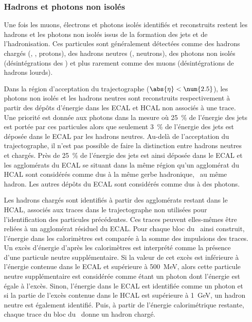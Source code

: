 \subsubsection{Hadrons et photons non isolés}
Une fois les muons, électrons et photons isolés identifiés et reconstruits restent les hadrons et les photons non isolés issus de la formation des jets et de l'hadronisation.
Ces particules sont généralement détectées comme des hadrons chargés (\pionpm, \Kaonpm, protons), des hadrons neutres (\Kaonlong, neutrons), des photons non isolés (désintégrations des \pionnull) et plus rarement comme des muons (désintégrations de hadrons lourds).
\par Dans la région d'acceptation du trajectographe ($\abs{\eta}<\num{2.5}$), les photons non isolés et les hadrons neutres sont reconstruits respectivement à partir des dépôts d'énergie dans les ECAL et HCAL non associés à une trace.
Une priorité est donnée aux photons dans la mesure où \SI{25}{\%} de l'énergie des jets est portée par ces particules alors que seulement \SI{3}{\%} de l'énergie des jets est déposée dans le ECAL par les hadrons neutres.
Au-delà de l'acceptation du trajectographe, il n'est pas possible de faire la distinction entre hadrons neutres et chargés.
Près de \SI{25}{\%} de l'énergie des jets est ainsi déposée dans le ECAL et les agglomérats du ECAL se situant dans la même région qu'un agglomérat du HCAL sont considérés comme dus à la même gerbe hadronique, \ie\ au même hadron.
Les autres dépôts du ECAL sont considérés comme dus à des photons.
\par Les hadrons chargés sont identifiés à partir des agglomérats restant dans le HCAL, associés aux traces dans le trajectographe non utilisées pour l'identification des particules précédentes.
Ces traces peuvent elles-mêmes être reliées à un agglomérat résiduel du ECAL.
Pour chaque bloc du \PF\ ainsi construit, l'énergie dans les calorimètres est comparée à la somme des impulsions des traces.
Un excès d'énergie d'après les calorimètres est interprété comme la présence d'une particule neutre supplémentaire.
Si la valeur de cet excès est inférieure à l'énergie contenue dans le ECAL et supérieure à \SI{500}{\MeV},
alors cette particule neutre supplémentaire est considérée comme étant un photon dont l'énergie est égale à l'excès.
Sinon,
l'énergie dans le ECAL est identifiée comme un photon
et si la partie de l'excès contenue dans le HCAL est supérieure à \SI{1}{\GeV},
un hadron neutre est également identifié.
Puis, à partir de l'énergie calorimétrique restante, chaque trace du bloc du \PF\ donne un hadron chargé.